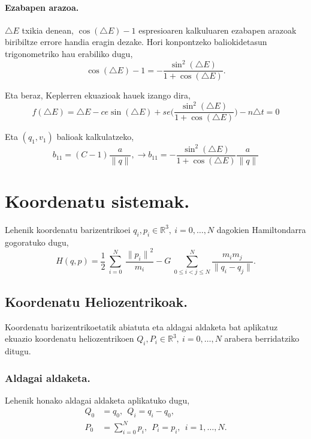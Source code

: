 \paragraph*{Ezabapen arazoa.} $\triangle E$ txikia denean, $\cos(\triangle E)-1$ espresioaren kalkuluaren ezabapen arazoak biribiltze errore handia eragin dezake. Hori konpontzeko baliokidetasun trigonometriko hau erabiliko dugu,
\begin{equation*}
\cos(\triangle E)-1=-\frac{\sin^2(\triangle E)}{1+\cos(\triangle E)}.
\end{equation*}  

Eta beraz, Keplerren ekuazioak hauek izango dira,
\begin{equation*}
f(\triangle E)=\triangle E - ce \sin(\triangle E)+ se \bigg(\frac{\sin^2(\triangle E)}{1+\cos(\triangle E)}\bigg)-n \triangle t=0
\end{equation*}

Eta $(q_1,v_1)$ balioak kalkulatzeko,
\begin{equation*}
b_{11}=(C-1) \frac{a}{\|q\|}, \longrightarrow b_{11}=-\frac{\sin^2(\triangle E)}{1+\cos(\triangle E)} \frac{a}{\|q\|}
\end{equation*}

\section{Koordenatu sistemak.}
\label{erans:A2}

Lehenik koordenatu barizentrikoei $q_i, p_i \in \mathbb{R}^3, \ i=0,\dots,N$ dagokien Hamiltondarra gogoratuko dugu,
\begin{equation}
H(q,p)=\frac{1}{2}\ \sum^N_{i=0}{\ \frac{{\|p_i\|}^2}{m_i}}-G\ \sum^N_{0\le i<j\le N}{\frac{m_im_j}{\|q_i-q_j\|}}.
\end{equation}

\subsection*{Koordenatu Heliozentrikoak.}

Koordenatu barizentrikoetatik abiatuta eta aldagai aldaketa bat aplikatuz ekuazio koordenatu heliozentrikoen $Q_i,P_i \in \mathbb{R}^3, \ i=0,\dots,N$ 
arabera berridatziko ditugu. 

\subsubsection*{Aldagai aldaketa.}
Lehenik honako aldagai aldaketa aplikatuko dugu,
\begin{align*}
Q_0 &=q_0, \ \ Q_i=q_i-q_0, \\ 
P_0 &=\sum\limits_{i=0}^{N}p_i, \ \ P_i=p_i, \ \ i=1,\dots{,N}.
\end{align*}

